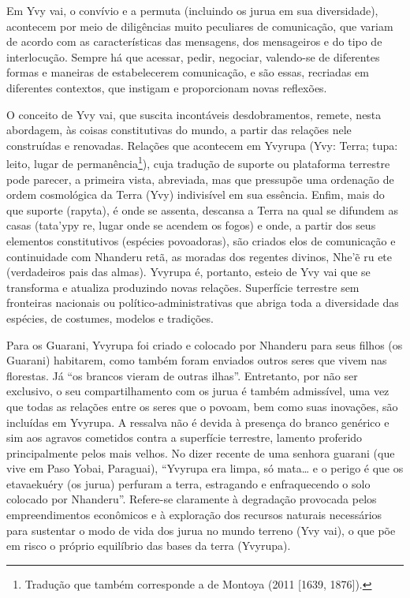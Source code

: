 Em Yvy vai, o convívio e a permuta (incluindo os jurua em sua
diversidade), acontecem por meio de diligências muito peculiares de
comunicação, que variam de acordo com as características das mensagens,
dos mensageiros e do tipo de interlocução. Sempre há que acessar,
pedir, negociar, valendo-se de diferentes formas e maneiras de
estabelecerem comunicação, e são essas, recriadas em diferentes
contextos, que instigam e proporcionam novas reflexões. 

O conceito de Yvy vai, que suscita incontáveis desdobramentos, remete,
nesta abordagem, às coisas constitutivas do mundo, a partir das
relações nele construídas e renovadas. Relações que acontecem em
Yvyrupa (Yvy: Terra; tupa: leito, lugar de
permanência\footnote{Tradução que também corresponde a de Montoya (2011
[1639, 1876]). }), cuja tradução de suporte ou plataforma terrestre
pode parecer, a primeira vista, abreviada, mas que pressupõe uma
ordenação de ordem cosmológica da Terra (Yvy) indivisível em sua
essência. Enfim, mais do que suporte (rapyta), é onde se assenta,
descansa a Terra na qual se difundem as casas (tata’ypy re, lugar onde
se acendem os fogos) e onde, a partir dos seus elementos constitutivos
(espécies povoadoras), são criados elos de comunicação e continuidade
com Nhanderu retã, as moradas dos regentes divinos, Nhe’ẽ ru ete
(verdadeiros pais das almas). Yvyrupa é, portanto, esteio de Yvy vai
que se transforma e atualiza produzindo novas relações. Superfície
terrestre sem fronteiras nacionais ou político-administrativas que
abriga toda a diversidade das espécies, de costumes, modelos e
tradições. 

Para os Guarani, Yvyrupa foi criado e colocado por Nhanderu para seus
filhos (os Guarani) habitarem, como também foram enviados outros seres
que vivem nas florestas. Já ``os brancos vieram de outras ilhas''.
Entretanto, por não ser exclusivo, o seu compartilhamento com os jurua
é também admissível, uma vez que todas as relações entre os seres que o
povoam, bem como suas inovações, são incluídas em Yvyrupa. A ressalva
não é devida à presença do branco genérico e sim aos agravos cometidos
contra a superfície terrestre, lamento proferido principalmente pelos
mais velhos. No dizer recente de uma senhora guarani (que vive em Paso
Yobai, Paraguai), ``Yvyrupa era limpa, só mata\ldots{} e o perigo é que os
etavaekuéry (os jurua) perfuram a terra, estragando e enfraquecendo o
solo colocado por Nhanderu''. Refere-se claramente à degradação
provocada pelos empreendimentos econômicos e à exploração dos recursos
naturais necessários para sustentar o modo de vida dos jurua no mundo
terreno (Yvy vai), o que põe em risco o próprio equilíbrio das bases da
terra (Yvyrupa). 

